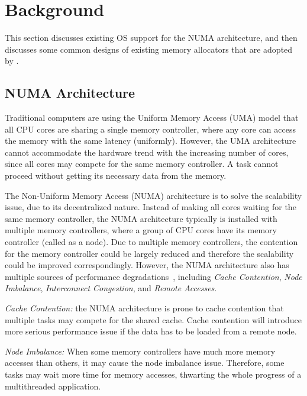 \section{Background}
\label{sec:background}

This section discusses existing OS support for the NUMA architecture, and then discusses some common designs of existing memory allocators that are adopted by \NM{}.  

\subsection{NUMA Architecture}

\label{sec:numa}

Traditional computers are using the Uniform Memory Access (UMA) model that all CPU cores are sharing a single memory controller, where any core can access the memory with the same latency (uniformly). However, the UMA architecture cannot accommodate the hardware trend with the increasing number of cores, since all cores may compete for the same memory controller. 
A task cannot proceed without getting its necessary data from the memory. 

The Non-Uniform Memory Access (NUMA) architecture is to solve the scalability issue, due to its decentralized nature. Instead of making all cores waiting for the same memory controller, the NUMA architecture typically is installed with multiple memory controllers, where a group of CPU cores have its memory controller (called as a node). Due to multiple memory controllers, the contention for the memory controller could be largely reduced and therefore the scalability could be improved correspondingly. However, the NUMA architecture also has multiple sources of performance degradations~\cite{Blagodurov:2011:CNC:2002181.2002182}, including \textit{Cache Contention}, \textit{Node Imbalance}, \textit{Interconnect Congestion}, and \textit{Remote Accesses}. 

\textit{Cache Contention:} the NUMA architecture is prone to cache contention that multiple tasks may compete for the shared cache. Cache contention will introduce more serious performance issue if the data has to be loaded from a remote node. 
 
\textit{Node Imbalance:} When some memory controllers have much more memory accesses than others, it may cause the node imbalance issue. Therefore, some tasks may wait more time for memory accesses, thwarting the whole progress of a multithreaded application.  

